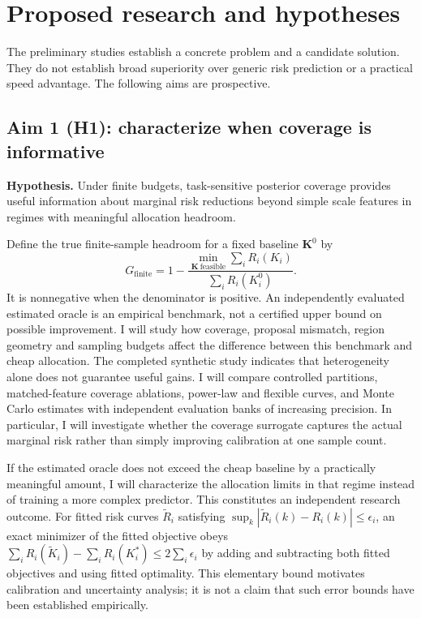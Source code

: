 \documentclass[10pt,letterpaper]{article}
\begin{document}
\section{Proposed research and hypotheses}
The preliminary studies establish a concrete problem and a candidate solution. They do not establish broad superiority over generic risk prediction or a practical speed advantage. The following aims are prospective.
\subsection{Aim 1 (H1): characterize when coverage is informative}
\textbf{Hypothesis.} Under finite budgets, task-sensitive posterior coverage provides useful information about marginal risk reductions beyond simple scale features in regimes with meaningful allocation headroom.

Define the true finite-sample headroom for a fixed baseline $\mathbf K^0$ by
\begin{equation}
 G_{\mathrm{finite}}=1-\frac{\min_{\mathbf K\ \mathrm{feasible}}\sum_i R_i(K_i)}{\sum_i R_i(K_i^0)}.
\end{equation}
It is nonnegative when the denominator is positive. An independently evaluated estimated oracle is an empirical benchmark, not a certified upper bound on possible improvement. I will study how coverage, proposal mismatch, region geometry and sampling budgets affect the difference between this benchmark and cheap allocation. The completed synthetic study indicates that heterogeneity alone does not guarantee useful gains. I will compare controlled partitions, matched-feature coverage ablations, power-law and flexible curves, and Monte Carlo estimates with independent evaluation banks of increasing precision. In particular, I will investigate whether the coverage surrogate captures the actual marginal risk rather than simply improving calibration at one sample count.

If the estimated oracle does not exceed the cheap baseline by a practically meaningful amount, I will characterize the allocation limits in that regime instead of training a more complex predictor. This constitutes an independent research outcome. For fitted risk curves $\widetilde R_i$ satisfying $\sup_k|\widetilde R_i(k)-R_i(k)|\le\epsilon_i$, an exact minimizer of the fitted objective obeys $\sum_i R_i(\widetilde K_i)-\sum_i R_i(K_i^*)\le 2\sum_i\epsilon_i$ by adding and subtracting both fitted objectives and using fitted optimality. This elementary bound motivates calibration and uncertainty analysis; it is not a claim that such error bounds have been established empirically.
\end{document}

